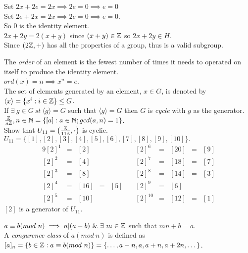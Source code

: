 \documentclass[11pt,a4paper]{article}
\begin{document}
Set $2x + 2e = 2x \implies 2e = 0 \implies e=0$\\
Set $2e+2x=2x \implies 2e = 0 \implies e = 0$.\\
So $0$ is the identity element.\\

$2x + 2y = 2(x+y)$ since $(x+y) \in \mathbb{Z}$ so $2x+2y \in H$.\\

Since $(2\mathbb{Z}, +)$ has all the properties of a group, thus is a valid subgroup.\\


The \textit{order} of an element is the fewest number of times it needs to operated on itself to produce the identity element.\\
\-\hspace{2em} $ord(x) = n \implies x^n = e$.\\
The set of elements generated by an element, $x \in G$, is denoted by $\langle x \rangle = \{x^i:i\in \mathbb{Z}\} \leq G$.\\
If $\exists\ g \in G\ st\ \langle g \rangle = G$ such that $\langle g \rangle = G$ then $G$ is \textit{cycle} with $g$ as the generator.\\
$\frac{\mathbb{Z}}{n\mathbb{Z}}, n \in \mathbb{N} = \left\{ [a] : a \in \mathbb{N}; gcd(a, n) = 1\right\}$.\\

Show that $U_{11} = \left(\frac{\mathbb{Z}}{11\mathbb{Z}}, \boldsymbol{\cdot} \right)$ is cyclic.\\

$U_{11} = \{[1], [2], [3], [4],[5],[6],[7],[8],[9],[10]\}.$
\begin{alignat*}{9}
[2]^1&=&[2]&&&\quad[2]^6&=&[20]&=&[9]\\
[2]^2&=&[4]&&&\quad[2]^7&=&[18]&=&[7]\\
[2]^3&=&[8]&&&\quad[2]^8&=&[14]&=&[3]\\
[2]^4&=&[16]&=&[5]&\quad[2]^9&=&[6]\\
[2]^5&=&[10]&&&\quad[2]^{10}&=&[12]&=&[1]
\end{alignat*}
$[2]$ is a generator of $U_{11}$.\\


$a\equiv b(mod\ n) \implies n|(a-b)\ \&\ \exists\ m \in \integers$ such that $mn+b=a$.\\
A \textit{congurence class} of $a (mod\ n)$ is defined as\\
\-\hspace{2em}$[a]_n = \{b\in\mathbb{Z}:a\equiv b(mod\ n)\} = \{\dots, a-n, a, a+n, a+2n, \dots\}$.\\
\end{document}
